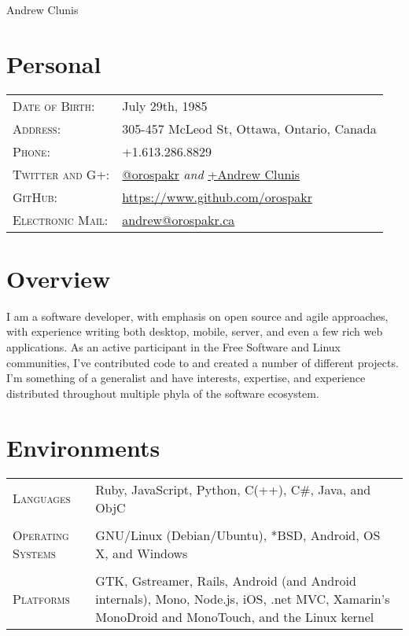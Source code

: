 \documentclass[letterpaper,10pt]{article}
\begin{document}
\pagestyle{empty} %

\par{\centering
{\Huge Andrew \textsc Clunis
}\bigskip\par}

\section{Personal}
\begin{longtable}{p{3cm}|p{12cm}}
  \textsc{Date of Birth:} & July 29th, 1985 \\
  \textsc{Address:} & 305-457 McLeod St, Ottawa, Ontario, Canada \\
  \textsc{Phone:} & +1.613.286.8829 \\
  \textsc{Twitter and G+:} & \href{http://twitter.com/orospakr}{@orospakr} \emph{and} \href{https://plus.google.com/101728978406554574081}{+Andrew Clunis}\\
  \textsc{GitHub:} & \href{https://github.com/orospakr}{https://www.github.com/orospakr} \\
  \textsc{Electronic Mail:} & \href{mailto:andrew@orospakr.ca}{andrew@orospakr.ca} \\
\end{longtable}

\section{Overview}
I am a software developer, with emphasis on open source and agile
approaches, with experience writing both desktop, mobile, server, and
even a few rich web applications.  As an active participant in the
Free Software and Linux communities, I've contributed code to and
created a number of different projects.  I'm something of a generalist
and have interests, expertise, and experience distributed throughout
multiple phyla of the software ecosystem.

\section{Environments}
\begin{longtable}{p{3cm}|p{12cm}}
  \textsc{Languages} & Ruby, JavaScript, Python, C(++), C\#, Java, and ObjC \\
  \multicolumn{2}{c}{} \\
  \textsc{Operating Systems} & GNU/Linux (Debian/Ubuntu), *BSD, Android, OS X, and Windows\\
  \multicolumn{2}{c}{} \\
  \textsc{Platforms} & GTK, Gstreamer, Rails, Android (and Android internals), Mono, Node.js, iOS, .net MVC, Xamarin's MonoDroid and MonoTouch, and the Linux kernel
\end{longtable}
\end{document}
